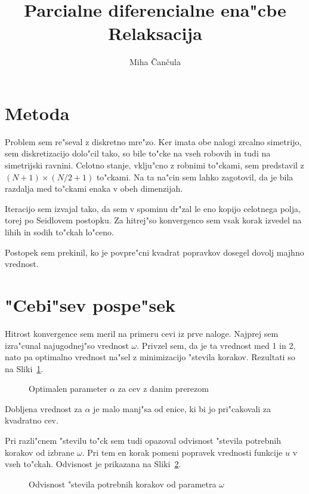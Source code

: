 \documentclass[a4paper,10pt]{article}
\title{Parcialne diferencialne ena"cbe \\ Relaksacija}
\author{Miha \v Can\v cula}
\begin{document}
\maketitle

\section{Metoda}

Problem sem re"seval z diskretno mre"zo. Ker imata obe nalogi zrcalno simetrijo, sem diskretizacijo dolo"cil tako, so bile to"cke na vseh robovih in tudi na simetrijski ravnini. Celotno stanje, vklju"cno z robnimi to"ckami, sem predstavil z $(N+1) \times (N/2+1)$ to"ckami. Na ta na"cin sem lahko zagotovil, da je bila razdalja med to"ckami enaka v obeh dimenzijah. 

Iteracijo sem izvajal tako, da sem v spominu dr"zal le eno kopijo celotnega polja, torej po Seidlovem postopku. Za hitrej"so konvergenco sem vsak korak izvedel na lihih in sodih to"ckah lo"ceno. 

Postopek sem prekinil, ko je povpre"cni kvadrat popravkov dosegel dovolj majhno vrednost. 

\section{"Cebi"sev pospe"sek}

Hitrost konvergence sem meril na primeru cevi iz prve naloge. Najprej sem izra"cunal najugodnej"so vrednost $\omega$. Privzel sem, da je ta vrednost med 1 in 2, nato pa optimalno vrednost na"sel z minimizacijo "stevila korakov. Rezultati so na Sliki~\ref{fig:omega-min}. 

\begin{figure}[H]
  
  \caption{Optimalen parameter $\alpha$ za cev z danim prerezom}
  \label{fig:omega-min}
\end{figure}

Dobljena vrednost za $\alpha$ je malo manj"sa od enice, ki bi jo pri"cakovali za kvadratno cev. 

Pri razli"cnem "stevilu to"ck sem tudi opazoval odvisnost "stevila potrebnih korakov od izbrane $\omega$. Pri tem en korak pomeni popravek vrednosti funkcije $u$ v vseh to"ckah. Odvisnost je prikazana na Sliki~\ref{fig:omega}. 

\begin{figure}[H]
  
  \caption{Odvisnost "stevila potrebnih korakov od parametra $\omega$}
  \label{fig:omega}
\end{figure}
\end{document}
